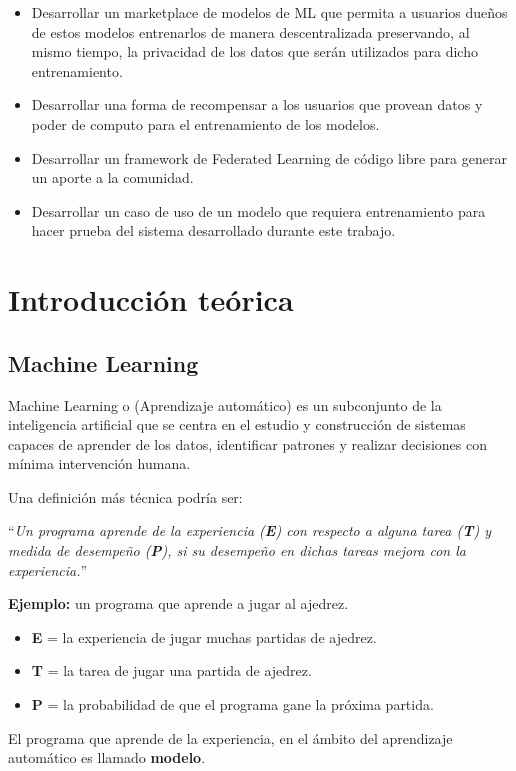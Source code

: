 \documentclass[
11pt, %
oneside, %
spanish, %
singlespacing, %
parskip, %
headsepline, %
chapterinoneline, %
]{MastersDoctoralThesis} %
\begin{document}
\begin{itemize}
\item Desarrollar un marketplace de modelos de ML que permita a usuarios dueños de estos modelos entrenarlos de manera descentralizada preservando, al mismo tiempo, la privacidad de los datos que serán utilizados para dicho entrenamiento.
\item Desarrollar una forma de recompensar a los usuarios que provean datos y poder de computo para el entrenamiento de los modelos.
\item Desarrollar un framework de Federated Learning de código libre para generar un aporte a la comunidad.
\item Desarrollar un caso de uso de un modelo que requiera entrenamiento para hacer prueba del sistema desarrollado durante este trabajo.
\end{itemize}


\chapter{Introducción teórica}

\section{Machine Learning}
Machine Learning\cite{ml} o (Aprendizaje automático) es un subconjunto de la inteligencia artificial que se centra en el estudio y construcción de sistemas capaces de aprender de los datos, identificar patrones y realizar decisiones con mínima intervención humana.

Una definición más técnica podría ser: 

``\textit{Un programa aprende de la experiencia (\textbf{E}) con respecto a alguna tarea (\textbf{T}) y medida de desempeño (\textbf{P}), si su desempeño en dichas tareas mejora con la experiencia.}''

\textbf{Ejemplo:} un programa que aprende a jugar al ajedrez.
\begin{itemize}
\item \textbf{E} = la experiencia de jugar muchas partidas de ajedrez.
\item \textbf{T} = la tarea de jugar una partida de ajedrez.
\item \textbf{P} = la probabilidad de que el programa gane la próxima partida.
\end{itemize}

El programa que aprende de la experiencia, en el ámbito del aprendizaje automático es llamado \textbf{modelo}.
\end{document}
